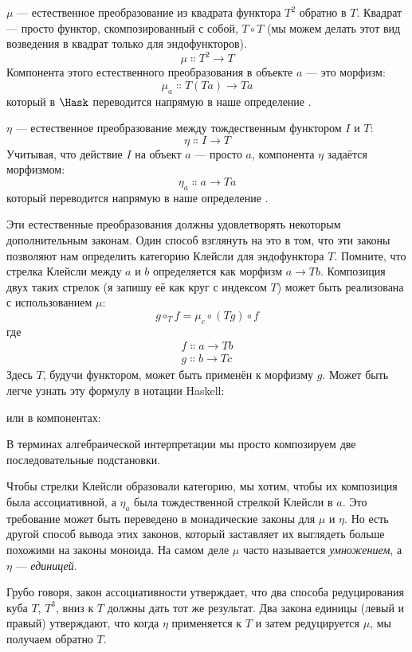 $\mu$ --- естественное преобразование из квадрата функтора $T^2$
обратно в $T$. Квадрат --- просто функтор, скомпозированный с
собой, $T \circ T$ (мы можем делать этот вид возведения в квадрат только для
эндофункторов).
\[\mu \Colon T^2 \to T\]
Компонента этого естественного преобразования в объекте $a$ ---
это морфизм:
\[\mu_a \Colon T (T a) \to T a\]
который в $\Hask$ переводится напрямую в наше определение
.

$\eta$ --- естественное преобразование между тождественным функтором $I$
и $T$:
\[\eta \Colon I \to T\]
Учитывая, что действие $I$ на объект $a$ ---
просто $a$, компонента $\eta$ задаётся морфизмом:
\[\eta_a \Colon a \to T a\]
который переводится напрямую в наше определение .

Эти естественные преобразования должны удовлетворять некоторым дополнительным законам. Один способ
взглянуть на это в том, что эти законы позволяют нам определить категорию Клейсли для
эндофунктора $T$. Помните, что стрелка Клейсли между
$a$ и $b$ определяется как морфизм
$a \to T b$. Композиция двух таких стрелок
(я запишу её как круг с индексом $T$) может быть
реализована с использованием $\mu$:
\[g \circ_T f = \mu_c \circ (T g) \circ f\]
где
\begin{gather*}
  f \Colon a \to T b \\
  g \Colon b \to T c
\end{gather*}
Здесь $T$, будучи функтором, может быть применён к морфизму
$g$. Может быть легче узнать эту формулу в нотации Haskell:

или в компонентах:

В терминах алгебраической интерпретации мы просто композируем две
последовательные подстановки.

Чтобы стрелки Клейсли образовали категорию, мы хотим, чтобы их композиция была
ассоциативной, а $\eta_a$ была тождественной стрелкой Клейсли в
$a$. Это требование может быть переведено в монадические законы для $\mu$ и
$\eta$. Но есть другой способ вывода этих законов, который заставляет их выглядеть
больше похожими на законы моноида. На самом деле $\mu$ часто называется
\emph{умножением}, а $\eta$ --- \emph{единицей}.

Грубо говоря, закон ассоциативности утверждает, что два способа
редуцирования куба $T$, $T^3$, вниз к $T$ должны
дать тот же результат. Два закона единицы (левый и правый) утверждают, что когда
$\eta$ применяется к $T$ и затем редуцируется $\mu$, мы
получаем обратно $T$.

